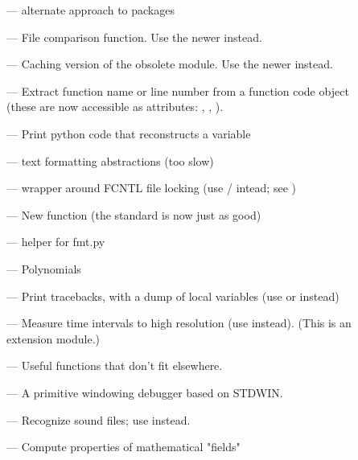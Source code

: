 \begin{description}
\item[]
--- alternate approach to packages

\item[]
--- File comparison function.  Use the newer  instead.

\item[]
--- Caching version of the obsolete  module.  Use the
newer  instead.

\item[]
--- Extract function name or line number from a function
code object (these are now accessible as attributes:
, ,
).

\item[]
--- Print python code that reconstructs a variable

\item[]
--- text formatting abstractions (too slow)

\item[]
--- wrapper around FCNTL file locking (use
/ intead; see )

\item[]
--- New  function (the standard  is
now just as good)

\item[]
--- helper for fmt.py

\item[]
--- Polynomials

\item[]
--- Print tracebacks, with a dump of local variables (use
 or  instead)

\item[]
--- Measure time intervals to high resolution (use
 instead).  (This is an extension module.)

\item[]
--- Useful functions that don't fit elsewhere.

\item[]
--- A primitive windowing debugger based on STDWIN.

\item[]
--- Recognize sound files; use  instead.

\item[]
--- Compute properties of mathematical "fields"
\end{description}


